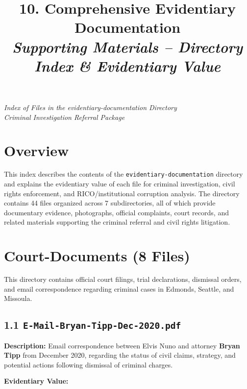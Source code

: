 \documentclass[11pt, letterpaper]{article}
\title{\textbf{10. Comprehensive Evidentiary Documentation}\\
\textit{Supporting Materials -- Directory Index \& Evidentiary Value}}
\author{}
\date{}
\begin{document}
\maketitle

\vspace{0.5in}

\begin{center}
\textit{Index of Files in the evidentiary-documentation Directory}\\
\textit{Criminal Investigation Referral Package}
\end{center}

\vspace{0.5in}

\section*{Overview}

This index describes the contents of the \texttt{evidentiary-documentation} directory and explains the evidentiary value of each file for criminal investigation, civil rights enforcement, and RICO/institutional corruption analysis. The directory contains 44 files organized across 7 subdirectories, all of which provide documentary evidence, photographs, official complaints, court records, and related materials supporting the criminal referral and civil rights litigation.

\vspace{0.3in}

\section{Court-Documents (8 Files)}

This directory contains official court filings, trial declarations, dismissal orders, and email correspondence regarding criminal cases in Edmonds, Seattle, and Missoula.

\subsection{1.1 \texttt{E-Mail-Bryan-Tipp-Dec-2020.pdf}}

\textbf{Description:} Email correspondence between Elvis Nuno and attorney \textbf{Bryan Tipp} from December 2020, regarding the status of civil claims, strategy, and potential actions following dismissal of criminal charges.

\textbf{Evidentiary Value:}
\end{document}
